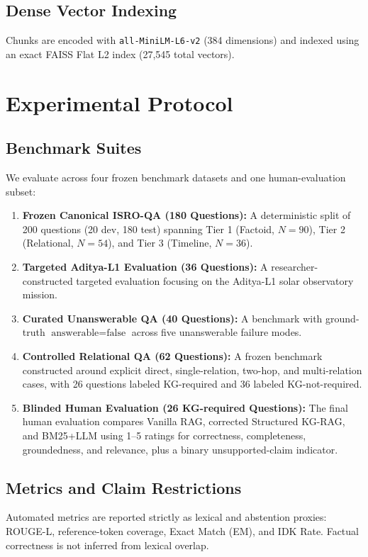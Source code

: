 \documentclass[conference]{IEEEtran}
\begin{document}
\subsection{Dense Vector Indexing}
Chunks are encoded with \texttt{all-MiniLM-L6-v2} (384 dimensions) and indexed using an exact FAISS Flat L2 index (27,545 total vectors).

\section{Experimental Protocol}
\label{sec:protocol}

\subsection{Benchmark Suites}
We evaluate across four frozen benchmark datasets and one human-evaluation subset:
\begin{enumerate}
    \item \textbf{Frozen Canonical ISRO-QA (180 Questions):} A deterministic split of 200 questions (20 dev, 180 test) spanning Tier 1 (Factoid, $N=90$), Tier 2 (Relational, $N=54$), and Tier 3 (Timeline, $N=36$).
    \item \textbf{Targeted Aditya-L1 Evaluation (36 Questions):} A researcher-constructed targeted evaluation focusing on the Aditya-L1 solar observatory mission.
    \item \textbf{Curated Unanswerable QA (40 Questions):} A benchmark with ground-truth $\text{answerable} = \text{false}$ across five unanswerable failure modes.
    \item \textbf{Controlled Relational QA (62 Questions):} A frozen benchmark constructed around explicit direct, single-relation, two-hop, and multi-relation cases, with 26 questions labeled KG-required and 36 labeled KG-not-required.
    \item \textbf{Blinded Human Evaluation (26 KG-required Questions):} The final human evaluation compares Vanilla RAG, corrected Structured KG-RAG, and BM25+LLM using 1--5 ratings for correctness, completeness, groundedness, and relevance, plus a binary unsupported-claim indicator.\end{enumerate}

\subsection{Metrics and Claim Restrictions}
Automated metrics are reported strictly as lexical and abstention proxies: ROUGE-L, reference-token coverage, Exact Match (EM), and IDK Rate. Factual correctness is not inferred from lexical overlap.
\end{document}
